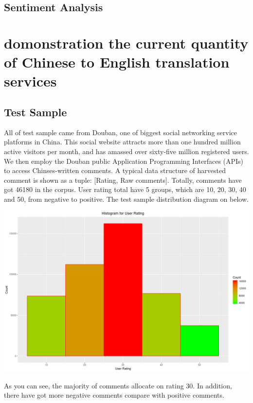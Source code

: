\documentclass[conference]{IEEEtran}
\begin{document}
\subsection{Sentiment Analysis}

\section{domonstration the current quantity of Chinese to English translation services}

\subsection{Test Sample}
All of test sample came from Douban, one of biggest social networking service
platforms in China. This social website attracts more than one hundred million
active visitors per month, and has amassed over sixty-five million registered
users. We then employ the Douban public Application Programming Interfaces
(APIs) to access Chinses-written comments. A typical data structure of harvested
comment is shown as a tuple: [Rating, Raw comments]. Totally, comments have got
46180 in the corpus. User rating total have 5 groups, which are 10, 20, 30, 40
and 50, from negative to positive.
The test sample distribution diagram on below.
\centerline{\includegraphics[width=0.3\paperwidth]{./img/ratingHis.png}}
As you can see, the majority of comments allocate on rating 30. In addition,
there have got more negative comments compare with positive comments.
\end{document}
